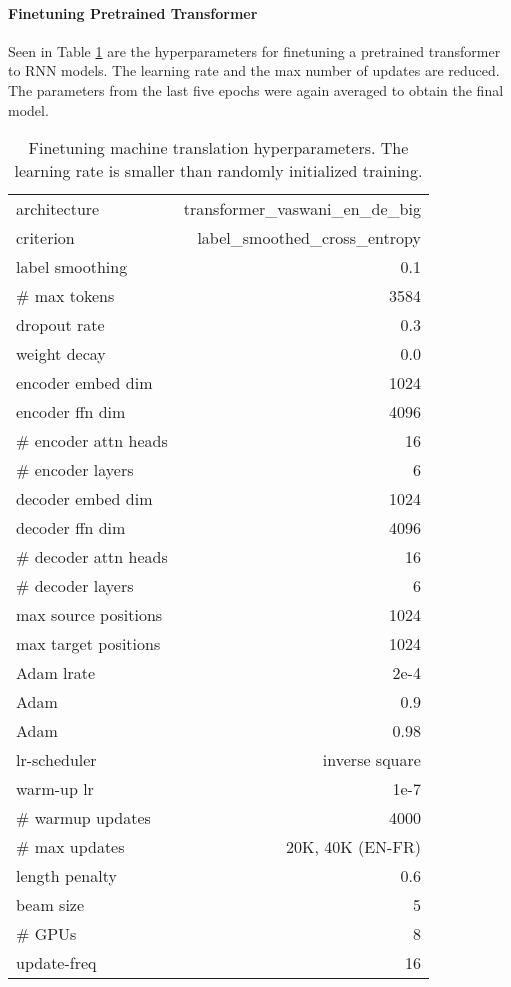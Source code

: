 \documentclass[11pt]{article}
\begin{document}
\paragraph{Finetuning Pretrained Transformer}
Seen in Table \ref{tab:mt-ft-hyp} are the hyperparameters for finetuning a pretrained transformer to RNN models. The learning rate and the max number of updates are reduced.
The parameters from the last five epochs were again averaged to obtain the final model.
\begin{table}[h]
\small
\centering
\begin{tabular}{ |l r|}
\hline
architecture & transformer\_vaswani\_en\_de\_big\\
criterion & label\_smoothed\_cross\_entropy\\
label smoothing & 0.1\\
\# max tokens & 3584 \\
dropout rate & 0.3\\
weight decay & 0.0 \\
encoder embed dim  & 1024\\
encoder ffn dim  & 4096\\
\# encoder attn heads & 16\\
\# encoder layers & 6 \\
decoder embed dim  & 1024\\
decoder ffn dim  & 4096\\
\# decoder attn heads & 16\\
\# decoder layers & 6 \\
max source positions & 1024 \\
max target positions & 1024 \\
Adam lrate& 2e-4 \\
Adam & 0.9\\
Adam & 0.98\\
lr-scheduler &  inverse square \\
warm-up lr & 1e-7 \\
\# warmup updates & 4000 \\
\# max updates &  20K, 40K (EN-FR) \\
length penalty & 0.6\\
beam size & 5\\
\# GPUs & 8 \\
update-freq & 16\\
\hline
\end{tabular}
\caption{Finetuning machine translation hyperparameters. The learning rate is smaller than randomly initialized training.}
\label{tab:mt-ft-hyp}
\end{table}
\end{document}
